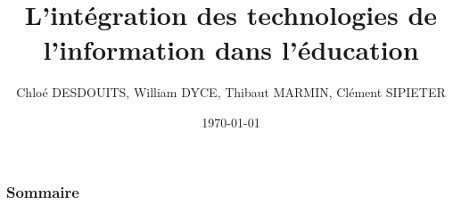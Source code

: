 \documentclass[utf8]{beamer}
\title{L'intégration des technologies de l'information dans l'éducation}
\author{Chloé DESDOUITS, William DYCE, Thibaut MARMIN, Clément SIPIETER}
\date{\today}
\begin{document}
\frame[plain]{\titlepage}

\begin{frame}[plain]
	\frametitle{Sommaire}
	\tableofcontents
\end{frame} 





\end{document}

